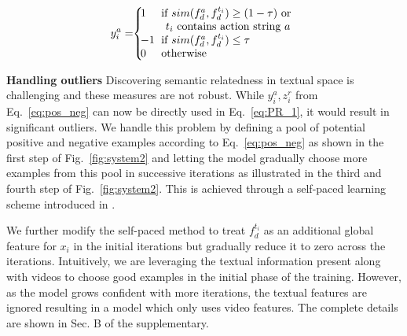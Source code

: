 \documentclass[10pt,twocolumn,letterpaper]{article}
\begin{document}
\vspace*{-6pt}
\begin{eqnarray}\label{eq:pos_neg}
  y_i^a = \hspace*{-3pt} \left\{
  \begin{array}{l l}
    \hspace*{-7pt} 1 & \hspace*{-4pt} \text{if $sim(f_{d}^a, f_{d}^{t_i}) \geq (1 - \tau)$ \text{or}} \\
   & \text{$t_i$ contains action string $a$}\\
   \hspace*{-7pt} -1 & \hspace*{-4pt} \text{if $sim(f_{d}^a, f_{d}^{t_i}) \leq \tau$}\\
   \hspace*{-7pt} 0 & \hspace*{-4pt} \text{otherwise}
  \end{array} \right.
\end{eqnarray}


\noindent \textbf{Handling outliers} \label{sec:SPL}
Discovering semantic relatedness in textual space is challenging and these measures are not robust. While $y_i^a, z_i^r$ from Eq.~\ref{eq:pos_neg} can now be directly used in Eq.~\ref{eq:PR_1}, it would result in significant outliers. We handle this problem by defining a pool of potential positive and negative examples according to Eq.~\ref{eq:pos_neg} as shown in the first step of Fig.~\ref{fig:system2} and letting the model gradually choose more examples from this pool in successive iterations as illustrated in the third and fourth step of Fig.~\ref{fig:system2}. This is achieved through a self-paced learning scheme introduced in \cite{Kumar_NIPS10}. 

We further modify the self-paced method to treat $f_{d}^{t_i}$ as an additional
global feature for $x_i$ in the initial iterations but gradually
reduce it to zero across the iterations.
Intuitively, we are leveraging the textual
information present along with videos to choose good examples in the initial
phase of the training. However, as the model grows confident with more
iterations, the textual features are ignored resulting in a model which only
uses video features. The complete details are shown in Sec. B of the supplementary.

\end{document}

